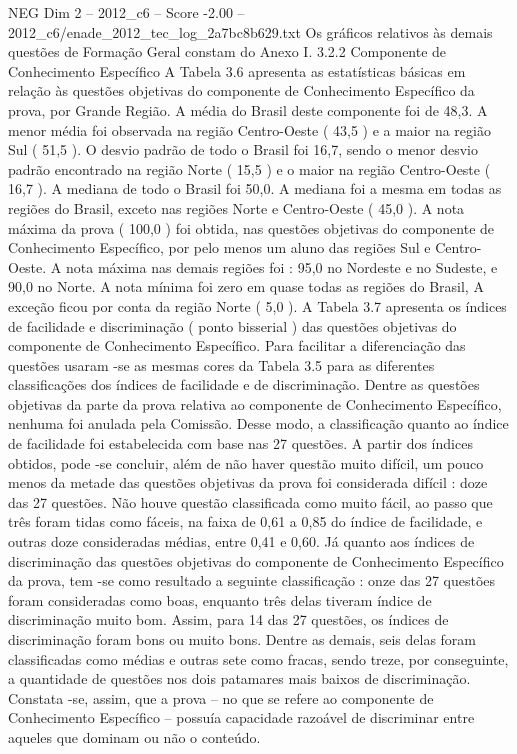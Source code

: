 \begin{textsample}{NEG Dim 2 – 2012\_c6 – Score -2.00 – 2012\_c6/enade\_2012\_tec\_log\_2a7bc8b629.txt}
Os gráficos relativos às demais questões de Formação Geral constam do Anexo I. 3.2.2 Componente de Conhecimento Específico A Tabela 3.6 apresenta as estatísticas básicas em relação às questões objetivas do componente de Conhecimento Específico da prova, por Grande Região.
A média do Brasil deste componente foi de 48,3.
A menor média foi observada na região Centro-Oeste ( 43,5 ) e a maior na região Sul ( 51,5 ).
O desvio padrão de todo o Brasil foi 16,7, sendo o menor desvio padrão encontrado na região Norte ( 15,5 ) e o maior na região Centro-Oeste ( 16,7 ).
A mediana de todo o Brasil foi 50,0.
A mediana foi a mesma em todas as regiões do Brasil, exceto nas regiões Norte e Centro-Oeste ( 45,0 ).
A nota máxima da prova ( 100,0 ) foi obtida, nas questões objetivas do componente de Conhecimento Específico, por pelo menos um aluno das regiões Sul e Centro-Oeste.
A nota máxima nas demais regiões foi : 95,0 no Nordeste e no Sudeste, e 90,0 no Norte.
A nota mínima foi zero em quase todas as regiões do Brasil, A exceção ficou por conta da região Norte ( 5,0 ).
A Tabela 3.7 apresenta os índices de facilidade e discriminação ( ponto bisserial ) das questões objetivas do componente de Conhecimento Específico.
Para facilitar a diferenciação das questões usaram -se as mesmas cores da Tabela 3.5 para as diferentes classificações dos índices de facilidade e de discriminação.
Dentre as questões objetivas da parte da prova relativa ao componente de Conhecimento Específico, nenhuma foi anulada pela Comissão.
Desse modo, a classificação quanto ao índice de facilidade foi estabelecida com base nas 27 questões.
A partir dos índices obtidos, pode -se concluir, além de não haver questão muito difícil, um pouco menos da metade das questões objetivas da prova foi considerada difícil : doze das 27 questões.
Não houve questão classificada como muito fácil, ao passo que três foram tidas como fáceis, na faixa de 0,61 a 0,85 do índice de facilidade, e outras doze consideradas médias, entre 0,41 e 0,60.
Já quanto aos índices de discriminação das questões objetivas do componente de Conhecimento Específico da prova, tem -se como resultado a seguinte classificação : onze das 27 questões foram consideradas como boas, enquanto três delas tiveram índice de discriminação muito bom.
Assim, para 14 das 27 questões, os índices de discriminação foram bons ou muito bons.
Dentre as demais, seis delas foram classificadas como médias e outras sete como fracas, sendo treze, por conseguinte, a quantidade de questões nos dois patamares mais baixos de discriminação.
Constata -se, assim, que a prova – no que se refere ao componente de Conhecimento Específico – possuía capacidade razoável de discriminar entre aqueles que dominam ou não o conteúdo.

\end{textsample}
